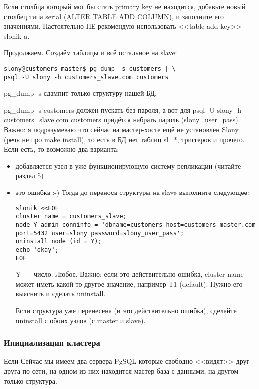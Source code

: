 Если столбца который мог бы стать primary key не находится, добавьте новый столбец типа serial (ALTER TABLE ADD COLUMN),
и заполните его значениями. Настоятельно НЕ рекомендую использовать <<table add key>> slonik-a.

Продолжаем.
Создаём таблицы и всё остальное на slave:
\begin{lstlisting}[label=lst:slony7,caption=Инициализация БД и plpgsql на slave]
slony@customers_master$ pg_dump -s customers | \
psql -U slony -h customers_slave.com customers
\end{lstlisting}

pg\_dump -s сдампит только структуру нашей БД.

pg\_dump -s customers должен пускать без пароля, а вот для psql -U slony -h customers\_slave.com
customers придётся набрать пароль (slony\_user\_pass). Важно: я подразумеваю что сейчас на мастер-хосте
ещё не установлен Slony (речь не про make install), то есть в БД нет таблиц sl\_*, триггеров и прочего.
Если есть, то возможно два варианта:
\begin{itemize}
\item добавляется узел в уже функционирующую систему репликации (читайте раздел 5)
\item это ошибка :-) Тогда до переноса структуры на slave выполните следующее:
\begin{lstlisting}[label=lst:slony8,caption=Инициализация БД и plpgsql на slave]
slonik <<EOF
cluster name = customers_slave;
node Y admin conninfo = 'dbname=customers host=customers_master.com
port=5432 user=slony password=slony_user_pass';
uninstall node (id = Y);
echo 'okay';
EOF
\end{lstlisting}
Y~--- число. Любое. Важно: если это действительно ошибка, cluster name может иметь какой-то другое значение, например T1
(default). Нужно его выяснить и сделать uninstall.

Если структура уже перенесена (и это действительно ошибка), сделайте uninstall с обоих узлов (с master и slave).
\end{itemize}

\subsubsection{Инициализация кластера}
Если Сейчас мы имеем два сервера PgSQL которые свободно <<видят>> друг друга по сети,
на одном из них находится мастер-база с данными, на другом~--- только структура.

